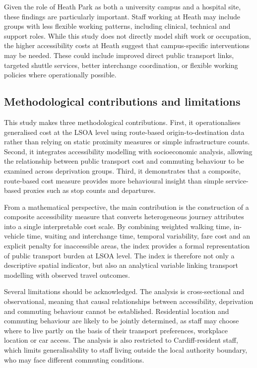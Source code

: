 \documentclass[11pt,a4paper]{article}
\begin{document}
Given the role of Heath Park as both a university campus and a hospital site, these findings are particularly important. Staff working at Heath may include groups with less flexible working patterns, including clinical, technical and support roles. While this study does not directly model shift work or occupation, the higher accessibility costs at Heath suggest that campus-specific interventions may be needed. These could include improved direct public transport links, targeted shuttle services, better interchange coordination, or flexible working policies where operationally possible.

\subsection{Methodological contributions and limitations}

This study makes three methodological contributions. First, it operationalises generalised cost at the LSOA level using route-based origin-to-destination data rather than relying on static proximity measures or simple infrastructure counts. Second, it integrates accessibility modelling with socioeconomic analysis, allowing the relationship between public transport cost and commuting behaviour to be examined across deprivation groups. Third, it demonstrates that a composite, route-based cost measure provides more behavioural insight than simple service-based proxies such as stop counts and departures.

From a mathematical perspective, the main contribution is the construction of a composite accessibility measure that converts heterogeneous journey attributes into a single interpretable cost scale. By combining weighted walking time, in-vehicle time, waiting and interchange time, temporal variability, fare cost and an explicit penalty for inaccessible areas, the index provides a formal representation of public transport burden at LSOA level. The index is therefore not only a descriptive spatial indicator, but also an analytical variable linking transport modelling with observed travel outcomes.

Several limitations should be acknowledged. The analysis is cross-sectional and observational, meaning that causal relationships between accessibility, deprivation and commuting behaviour cannot be established. Residential location and commuting behaviour are likely to be jointly determined, as staff may choose where to live partly on the basis of their transport preferences, workplace location or car access. The analysis is also restricted to Cardiff-resident staff, which limits generalisability to staff living outside the local authority boundary, who may face different commuting conditions.
\end{document}
